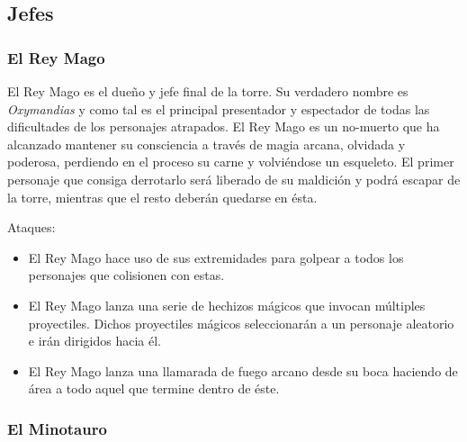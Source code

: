 \subsection{Jefes}


\subsubsection{El Rey Mago}

El Rey Mago es el dueño y jefe final de la torre. Su verdadero nombre es
\emph{Oxymandias} y como tal es el principal presentador y espectador de todas
las dificultades de los personajes atrapados. El Rey Mago es un no-muerto que ha
alcanzado mantener su consciencia a través de magia arcana, olvidada y poderosa,
perdiendo en el proceso su carne y volviéndose un esqueleto. El primer personaje
que consiga derrotarlo será liberado de su maldición y podrá escapar de la
torre, mientras que el resto deberán quedarse en ésta.

Ataques:
\begin{itemize}
    \item El Rey Mago hace uso de sus extremidades para golpear a todos los
    personajes que colisionen con estas.
    \item El Rey Mago lanza una serie de hechizos mágicos que invocan múltiples
    proyectiles. Dichos proyectiles mágicos seleccionarán a un personaje
    aleatorio e irán dirigidos hacia él.
    \item El Rey Mago lanza una llamarada de fuego arcano desde su boca haciendo
    de área a todo aquel que termine dentro de éste.
\end{itemize}


\subsubsection{El Minotauro}


